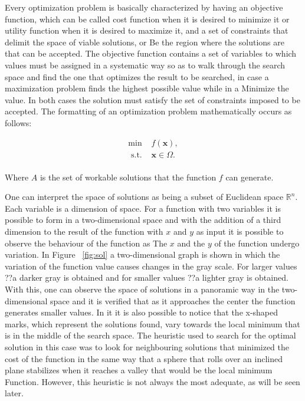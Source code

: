 \documentclass[conference,harvard,brazil,english]{sbatex}
\newcommand{\R}{\mathbb R}
\begin{document}
	Every optimization problem is basically characterized by having an objective function, which can be called cost function when it is desired to minimize it or utility function when it is desired to maximize it, and a set of constraints that delimit the space of viable solutions, or Be the region where the solutions are that can be accepted. The objective function contains a set of variables to which values must be assigned in a systematic way so as to walk through the search space and find the one that optimizes the result to be searched, in case a maximization problem finds the highest possible value while in a Minimize the value. In both cases the solution must satisfy the set of constraints imposed to be accepted. The formatting of an optimization problem mathematically occurs as follows:

	\begin{equation}
		\label{eq:optproblem}
		\begin{array}{cc}
		\min & f(\textbf{x}),  \\
		\textrm{ s.t. } & \textbf{x}\in\Omega.\\
		\end{array}
	\end{equation}	
	
	
	Where \(A\) is the set of workable solutions that the function \(f\) can generate.
	
	One can interpret the space of solutions as being a subset of Euclidean space \(\R^n\). Each variable is a dimension of space. For a function with two variables it is possible to form in a two-dimensional space and with the addition of a third dimension to the result of the function with \(x\) and \(y\) as input it is possible to observe the behaviour of the function as The \(x\) and the \(y\) of the function undergo variation. In Figure ~\ref{fig:sol} a two-dimensional graph is shown in which the variation of the function value causes changes in the gray scale. For larger values ??a darker gray is obtained and for smaller values ??a lighter gray is obtained. With this, one can observe the space of solutions in a panoramic way in the two-dimensional space and it is verified that as it approaches the center the function generates smaller values. In it it is also possible to notice that the x-shaped marks, which represent the solutions found, vary towards the local minimum that is in the middle of the search space. The heuristic used to search for the optimal solution in this case was to look for neighbouring solutions that minimized the cost of the function in the same way that a sphere that rolls over an inclined plane stabilizes when it reaches a valley that would be the local minimum Function. However, this heuristic is not always the most adequate, as will be seen later.
\end{document}
